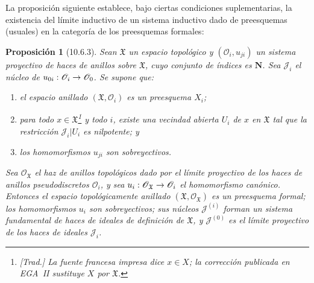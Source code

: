 \documentclass[oneside]{amsart}
\theoremstyle{ega-env-style}
\theoremstyle{ega-thm-env-style}
\newtheorem*{proposition}{Proposición}
\theoremstyle{ega-defn-env-style}
\renewcommand{\to}{\mathchoice{\longrightarrow}{\rightarrow}{\rightarrow}{\rightarrow}}
\newcommand{\oldpage}[2][]{{\marginnote{\normalfont{\textbf{#1}~|~#2}}}\ignorespaces}
\let\EGAOriginalLabel\label
\renewcommand{\label}[1]{\phantomsection\EGAOriginalLabel{#1}}
\begin{document}
La proposición siguiente establece, bajo ciertas condiciones suplementarias, la existencia del límite inductivo de un sistema inductivo dado de preesquemas (usuales) en la categoría de los preesquemas formales:
\begin{proposition}[10.6.3]
\label{I.10.6.3}
Sean $\mathfrak{X}$ un espacio topológico y $(\mathscr{O}_i,u_{ji})$ un sistema proyectivo de haces de anillos sobre $\mathfrak{X}$, cuyo conjunto de índices es $\mathbf{N}$.
Sea $\mathscr{J}_i$ el núcleo de $u_{0i}:\mathscr{O}_i\to\mathscr{O}_0$.
Se supone que:
\begin{enumerate}
  \item[\textup{a)}] el espacio anillado $(\mathfrak{X},\mathscr{O}_i)$ es un preesquema $X_i$;
  \item[\textup{b)}] para todo $x\in\mathfrak{X}$\footnote{\emph{[Trad.] La fuente francesa impresa dice $x\in X$; la corrección publicada en EGA~II sustituye $X$ por $\mathfrak{X}$.}} y todo $i$, existe una vecindad abierta $U_i$ de $x$ en $\mathfrak{X}$ tal que la restricción $\mathscr{J}_i|U_i$ es nilpotente; y
  \item[\textup{c)}] los homomorfismos $u_{ji}$ son sobreyectivos.
\end{enumerate}

\oldpage[I]{190}
Sea $\mathscr{O}_{\mathfrak{X}}$ el haz de anillos topológicos dado por el límite proyectivo de los haces de anillos pseudodiscretos $\mathscr{O}_i$, y sea $u_i:\mathscr{O}_{\mathfrak{X}}\to\mathscr{O}_i$ el homomorfismo canónico.
Entonces el espacio topológicamente anillado $(\mathfrak{X},\mathscr{O}_{\mathfrak{X}})$ es un preesquema formal; los homomorfismos $u_i$ son sobreyectivos; sus núcleos $\mathscr{J}^{(i)}$ forman un sistema fundamental de haces de ideales de definición de $\mathfrak{X}$, y $\mathscr{J}^{(0)}$ es el límite proyectivo de los haces de ideales $\mathscr{J}_i$.
\end{proposition}
\end{document}
